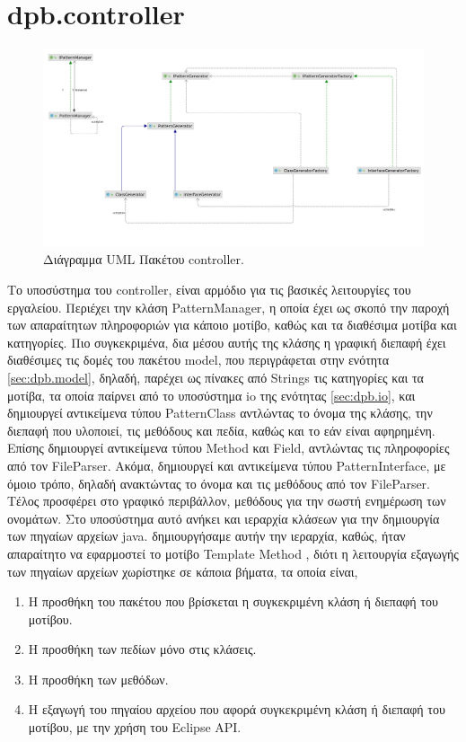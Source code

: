 \section{dpb.controller}
\label{sec:dpb.controller}
\begin{figure}[H]
    \centering
    \includegraphics[width=1.0\textwidth]{Figures/controller.png}
    \caption{Διάγραμμα UML Πακέτου controller.}
    \label{fig:controllerUML}
\end{figure}
Το υποσύστημα του controller, είναι αρμόδιο για τις βασικές λειτουργίες του εργαλείου. Περιέχει την κλάση PatternManager, 
η οποία έχει ως σκοπό την παροχή των απαραίτητων πληροφοριών για κάποιο μοτίβο, καθώς και τα διαθέσιμα μοτίβα και κατηγορίες. 
Πιο συγκεκριμένα, δια μέσου αυτής της κλάσης η γραφική διεπαφή έχει διαθέσιμες τις δομές του πακέτου model, που 
περιγράφεται στην ενότητα \ref{sec:dpb.model}, δηλαδή, παρέχει ως πίνακες από Strings τις κατηγορίες και τα μοτίβα, τα οποία παίρνει 
από το υποσύστημα io της ενότητας \ref{sec:dpb.io}, και δημιουργεί αντικείμενα τύπου PatternClass αντλώντας το όνομα της κλάσης, 
την διεπαφή που υλοποιεί, τις μεθόδους και πεδία, καθώς και το εάν είναι αφηρημένη. Επίσης δημιουργεί αντικείμενα τύπου Method και Field, 
αντλώντας τις πληροφορίες από τον FileParser. Ακόμα, δημιουργεί και αντικείμενα τύπου PatternInterface, με όμοιο τρόπο, 
δηλαδή ανακτώντας το όνομα και τις μεθόδους από τον FileParser. Τέλος προσφέρει στο γραφικό περιβάλλον, μεθόδους για την σωστή ενημέρωση των ονομάτων.
\newline \newline
Στο υποσύστημα αυτό ανήκει και ιεραρχία κλάσεων για την δημιουργία των πηγαίων αρχείων java. δημιουργήσαμε αυτήν την ιεραρχία, καθώς,
ήταν απαραίτητο να εφαρμοστεί το μοτίβο Template Method \cite{GoF}, διότι η λειτουργία εξαγωγής των πηγαίων αρχείων χωρίστηκε σε κάποια βήματα, τα οποία είναι,
\begin{enumerate}
    \item Η προσθήκη του πακέτου που βρίσκεται η συγκεκριμένη κλάση ή διεπαφή του μοτίβου.
    \item Η προσθήκη των πεδίων μόνο στις κλάσεις. \label{enum:fields}
    \item Η προσθήκη των μεθόδων. \label{enum:methods}
    \item Η εξαγωγή του πηγαίου αρχείου που αφορά συγκεκριμένη κλάση ή διεπαφή του μοτίβου, με την χρήση του Eclipse API.
\end{enumerate}
